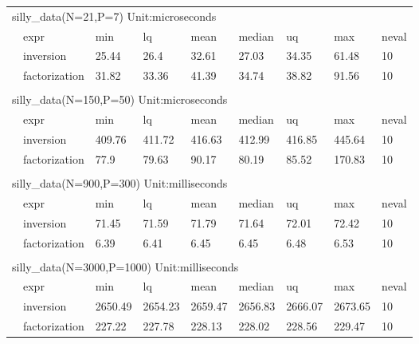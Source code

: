 \documentclass{article}
\begin{document}
\begin{tabular}{lllllllll}
\multicolumn{7}{l}{silly\_data(N=21,P=7) Unit:microseconds}                       &         &       \\
 & expr                        & min     & lq      & mean    & median  & uq      & max     & neval \\
 & inversion     & 25.44   & 26.4    & 32.61   & 27.03   & 34.35   & 61.48   & 10    \\
 & factorization & 31.82   & 33.36   & 41.39   & 34.74   & 38.82   & 91.56   & 10    \\
 &                             &         &         &         &         &         &         &       \\
\multicolumn{7}{l}{silly\_data(N=150,P=50) Unit:microseconds}                     &         &       \\
 & expr                        & min     & lq      & mean    & median  & uq      & max     & neval \\
 & inversion     & 409.76  & 411.72  & 416.63  & 412.99  & 416.85  & 445.64  & 10    \\
 & factorization & 77.9    & 79.63   & 90.17   & 80.19   & 85.52   & 170.83  & 10    \\
 &                             &         &         &         &         &         &         &       \\
\multicolumn{7}{l}{silly\_data(N=900,P=300) Unit:milliseconds}                    &         &       \\
 & expr                        & min     & lq      & mean    & median  & uq      & max     & neval \\
 & inversion     & 71.45   & 71.59   & 71.79   & 71.64   & 72.01   & 72.42   & 10    \\
 & factorization & 6.39    & 6.41    & 6.45    & 6.45    & 6.48    & 6.53    & 10    \\
 &                             &         &         &         &         &         &         &       \\
\multicolumn{7}{l}{silly\_data(N=3000,P=1000) Unit:milliseconds}                  &         &       \\
 & expr                        & min     & lq      & mean    & median  & uq      & max     & neval \\
 & inversion     & 2650.49 & 2654.23 & 2659.47 & 2656.83 & 2666.07 & 2673.65 & 10    \\
 & factorization & 227.22  & 227.78  & 228.13  & 228.02  & 228.56  & 229.47  & 10   
\end{tabular}
\end{document}
